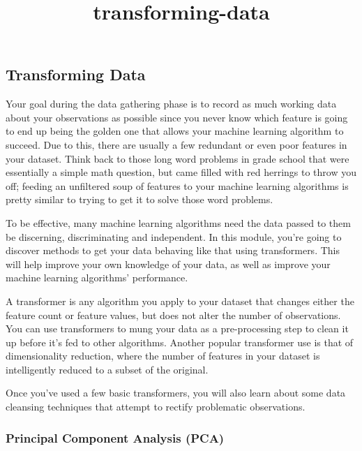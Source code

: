 \documentclass[11pt]{article}
\title{transforming-data}
\begin{document}
    
    
    \maketitle
    
    

    
    \hypertarget{transforming-data}{%
\subsection{Transforming Data}\label{transforming-data}}

Your goal during the data gathering phase is to record as much working
data about your observations as possible since you never know which
feature is going to end up being the golden one that allows your machine
learning algorithm to succeed. Due to this, there are usually a few
redundant or even poor features in your dataset. Think back to those
long word problems in grade school that were essentially a simple math
question, but came filled with red herrings to throw you off; feeding an
unfiltered soup of features to your machine learning algorithms is
pretty similar to trying to get it to solve those word problems.

To be effective, many machine learning algorithms need the data passed
to them be discerning, discriminating and independent. In this module,
you're going to discover methods to get your data behaving like that
using transformers. This will help improve your own knowledge of your
data, as well as improve your machine learning algorithms' performance.

A transformer is any algorithm you apply to your dataset that changes
either the feature count or feature values, but does not alter the
number of observations. You can use transformers to mung your data as a
pre-processing step to clean it up before it's fed to other algorithms.
Another popular transformer use is that of dimensionality reduction,
where the number of features in your dataset is intelligently reduced to
a subset of the original.

Once you've used a few basic transformers, you will also learn about
some data cleansing techniques that attempt to rectify problematic
observations.

    \hypertarget{principal-component-analysis-pca}{%
\subsubsection{Principal Component Analysis
(PCA)}\label{principal-component-analysis-pca}}
\end{document}

